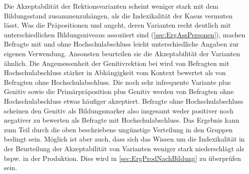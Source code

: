 Die Akzeptabilität der Rektionsvarianten scheint weniger stark mit dem Bildungsstand zusammenzuhängen, als die Indexikalität der Kasus vermuten lässt. 
Was die Präpositionen \wegen{} und \waehrend{} angeht, deren Varianten recht deutlich mit unterschiedlichen Bildungsniveaus assoziiert sind (\autoref{sec:ErgAssPersonen}), machen Befragte mit und ohne Hochschulabschluss leicht unterschiedliche Angaben zur eigenen Verwendung. 
Ansonsten beurteilen sie die Akzeptabilität der Varianten ähnlich. 
Die Angemessenheit der Genitivrektion bei \dank{} wird von Befragten mit Hochschulabschluss stärker in Abhängigkeit vom Kontext bewertet als von Befragten ohne Hochschulabschluss. 
Die noch sehr infrequente Variante \gegenueber{} plus Genitiv sowie die Primärpräposition  plus Genitiv werden von Befragten ohne Hochschulabschluss etwas häufiger akzeptiert. 
Befragte ohne Hochschulabschluss scheinen den Genitiv als Bildungsmarker also insgesamt weder positiver noch negativer zu bewerten als Befragte mit Hochschulabschluss. 
Das Ergebnis kann zum Teil durch die oben beschriebene ungünstige Verteilung in den Gruppen bedingt sein. 
Möglich ist aber auch, dass sich das Wissen um die Indexikalität in der Beurteilung der Akzeptabilität von Varianten weniger stark niederschlägt als bspw. in der Produktion. 
Dies wird in \autoref{sec:ErgProdNachBildung} zu überprüfen sein. 
